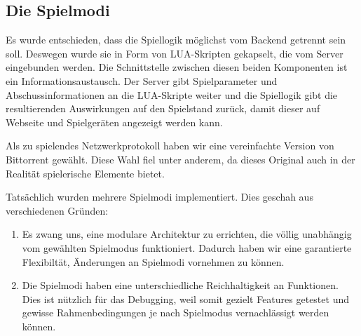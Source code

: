 \subsection{Die Spielmodi}

Es wurde entschieden, dass die Spiellogik möglichst vom Backend getrennt sein soll.
Deswegen wurde sie in Form von LUA-Skripten gekapselt, die vom Server eingebunden werden.
Die Schnittstelle zwischen diesen beiden Komponenten ist ein Informationsaustausch.
Der Server gibt Spielparameter und Abschussinformationen an die LUA-Skripte weiter und die
Spiellogik gibt die resultierenden Auswirkungen auf den Spielstand zurück, damit dieser auf Webseite
und Spielgeräten angezeigt werden kann.

Als zu spielendes Netzwerkprotokoll haben wir eine vereinfachte Version von Bittorrent gewählt.
Diese Wahl fiel unter anderem, da dieses Original auch in der Realität spielerische Elemente bietet.

Tatsächlich wurden mehrere Spielmodi implementiert.
Dies geschah aus verschiedenen Gründen:
\begin{enumerate}
  \item
    Es zwang uns, eine modulare Architektur zu errichten, die völlig unabhängig vom gewählten
    Spielmodus funktioniert.
    Dadurch haben wir eine garantierte Flexibiltät, Änderungen an Spielmodi vornehmen zu können.
  \item
    Die Spielmodi haben eine unterschiedliche Reichhaltigkeit an Funktionen.
    Dies ist nützlich für das Debugging, weil somit gezielt Features getestet und gewisse
    Rahmenbedingungen je nach Spielmodus vernachlässigt werden können.
\end{enumerate}

